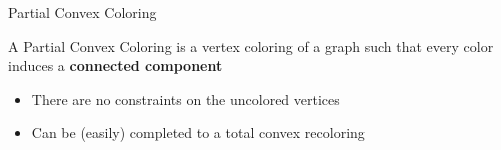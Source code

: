 \begin{frame}{Partial Convex Coloring}
\begin{definition}
A \alert{Partial Convex Coloring} 
is a vertex coloring of a graph such that every color induces a \textbf{connected component}
\end{definition}

\begin{itemize}

\pause\item
There are no constraints on the uncolored vertices

\pause\item
Can be (easily) completed to a total convex recoloring
  
\end{itemize}
\pause
\end{frame}

